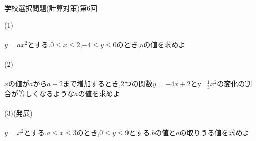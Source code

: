 \documentclass{jsarticle}
\begin{document}
\begin{center}
学校選択問題(計算対策)第6回
\end{center}

(1)
\\
\\
$y=ax^{2}$とする.$ 0 \leq x \leq 2$,$-4\leq y \leq 0$のとき,aの値を求めよ
\\
\\
\hspace{10pt}(2)
\\
\\
$x$の値が$a$から$a+2$まで増加するとき,2つの関数$y=-4x+2$とy=$\frac{1}{3}x^{2}$の変化の割合が等しくなるような$a$の値を求めよ
\\
\\
\hspace{10pt}(3)(発展)
\\
\\
$y=x^{2}$とする.$a\leq x \leq 3$のとき,$0 \leq y \leq 9 $とする.$b$の値と$a$の取りうる値を求めよ
\end{document}
